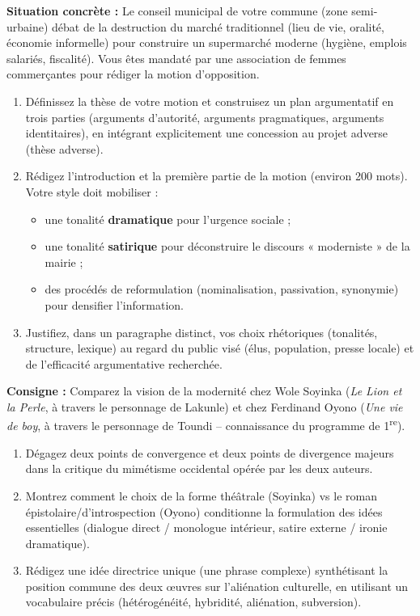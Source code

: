 \documentclass[11pt]{article}
\begin{document}
\begin{exercice}
\textbf{Situation concrète :} Le conseil municipal de votre commune (zone semi-urbaine) débat de la destruction du marché traditionnel (lieu de vie, oralité, économie informelle) pour construire un supermarché moderne (hygiène, emplois salariés, fiscalité). Vous êtes mandaté par une association de femmes commerçantes pour rédiger la motion d'opposition.
\begin{enumerate}
    \item Définissez la thèse de votre motion et construisez un plan argumentatif en trois parties (arguments d'autorité, arguments pragmatiques, arguments identitaires), en intégrant explicitement une concession au projet adverse (thèse adverse).
    \item Rédigez l'introduction et la première partie de la motion (environ 200 mots). Votre style doit mobiliser : 
    \begin{itemize}
        \item une tonalité \textbf{dramatique} pour l'urgence sociale ;
        \item une tonalité \textbf{satirique} pour déconstruire le discours « moderniste » de la mairie ;
        \item des procédés de reformulation (nominalisation, passivation, synonymie) pour densifier l'information.
    \end{itemize}
    \item Justifiez, dans un paragraphe distinct, vos choix rhétoriques (tonalités, structure, lexique) au regard du public visé (élus, population, presse locale) et de l'efficacité argumentative recherchée.
\end{enumerate}
\end{exercice}

\begin{exercice}
\textbf{Consigne :} Comparez la vision de la modernité chez Wole Soyinka (\textit{Le Lion et la Perle}, à travers le personnage de Lakunle) et chez Ferdinand Oyono (\textit{Une vie de boy}, à travers le personnage de Toundi -- connaissance du programme de 1\textsuperscript{re}).
\begin{enumerate}
    \item Dégagez deux points de convergence et deux points de divergence majeurs dans la critique du mimétisme occidental opérée par les deux auteurs.
    \item Montrez comment le choix de la forme théâtrale (Soyinka) vs le roman épistolaire/d'introspection (Oyono) conditionne la formulation des idées essentielles (dialogue direct / monologue intérieur, satire externe / ironie dramatique).
    \item Rédigez une idée directrice unique (une phrase complexe) synthétisant la position commune des deux œuvres sur l'aliénation culturelle, en utilisant un vocabulaire précis (hétérogénéité, hybridité, aliénation, subversion).
\end{enumerate}
\end{exercice}
\end{document}
